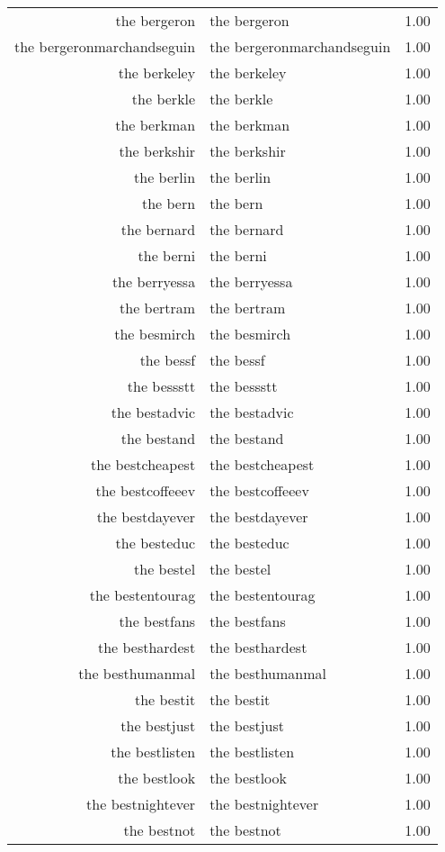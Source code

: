 \begin{table}[ht]
\begin{tabular}{rlr}
  the bergeron & the bergeron & 1.00 \\ 
  the bergeronmarchandseguin & the bergeronmarchandseguin & 1.00 \\ 
  the berkeley & the berkeley & 1.00 \\ 
  the berkle & the berkle & 1.00 \\ 
  the berkman & the berkman & 1.00 \\ 
  the berkshir & the berkshir & 1.00 \\ 
  the berlin & the berlin & 1.00 \\ 
  the bern & the bern & 1.00 \\ 
  the bernard & the bernard & 1.00 \\ 
  the berni & the berni & 1.00 \\ 
  the berryessa & the berryessa & 1.00 \\ 
  the bertram & the bertram & 1.00 \\ 
  the besmirch & the besmirch & 1.00 \\ 
  the bessf & the bessf & 1.00 \\ 
  the bessstt & the bessstt & 1.00 \\ 
  the bestadvic & the bestadvic & 1.00 \\ 
  the bestand & the bestand & 1.00 \\ 
  the bestcheapest & the bestcheapest & 1.00 \\ 
  the bestcoffeeev & the bestcoffeeev & 1.00 \\ 
  the bestdayever & the bestdayever & 1.00 \\ 
  the besteduc & the besteduc & 1.00 \\ 
  the bestel & the bestel & 1.00 \\ 
  the bestentourag & the bestentourag & 1.00 \\ 
  the bestfans & the bestfans & 1.00 \\ 
  the besthardest & the besthardest & 1.00 \\ 
  the besthumanmal & the besthumanmal & 1.00 \\ 
  the bestit & the bestit & 1.00 \\ 
  the bestjust & the bestjust & 1.00 \\ 
  the bestlisten & the bestlisten & 1.00 \\ 
  the bestlook & the bestlook & 1.00 \\ 
  the bestnightever & the bestnightever & 1.00 \\ 
  the bestnot & the bestnot & 1.00 \\ 

\end{tabular}
\end{table}
